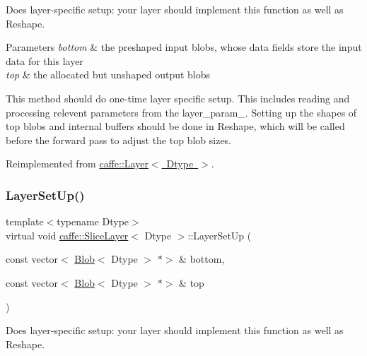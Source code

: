 Does layer-\/specific setup\+: your layer should implement this function as well as Reshape. 


\begin{DoxyParams}{Parameters}
{\em bottom} & the preshaped input blobs, whose data fields store the input data for this layer \\
\hline
{\em top} & the allocated but unshaped output blobs\\
\hline
\end{DoxyParams}
This method should do one-\/time layer specific setup. This includes reading and processing relevent parameters from the {\ttfamily layer\+\_\+param\+\_\+}. Setting up the shapes of top blobs and internal buffers should be done in {\ttfamily Reshape}, which will be called before the forward pass to adjust the top blob sizes. 

Reimplemented from \mbox{\hyperlink{classcaffe_1_1_layer_a481323a3e0972c682787f2137468c29f}{caffe\+::\+Layer$<$ Dtype $>$}}.

\mbox{\label{classcaffe_1_1_slice_layer_a17b30448f94f43b480c5c6393341109b}} 
\subsubsection{\texorpdfstring{Layer\+Set\+Up()}{LayerSetUp()}\hspace{0.1cm}{\footnotesize\ttfamily [2/2]}}
{\footnotesize\ttfamily template$<$typename Dtype$>$ \\
virtual void \mbox{\hyperlink{classcaffe_1_1_slice_layer}{caffe\+::\+Slice\+Layer}}$<$ Dtype $>$\+::Layer\+Set\+Up (\begin{DoxyParamCaption}\item[{const vector$<$ \mbox{\hyperlink{classcaffe_1_1_blob}{Blob}}$<$ Dtype $>$ $\ast$$>$ \&}]{bottom,  }\item[{const vector$<$ \mbox{\hyperlink{classcaffe_1_1_blob}{Blob}}$<$ Dtype $>$ $\ast$$>$ \&}]{top }\end{DoxyParamCaption})\hspace{0.3cm}{\ttfamily [virtual]}}



Does layer-\/specific setup\+: your layer should implement this function as well as Reshape. 


